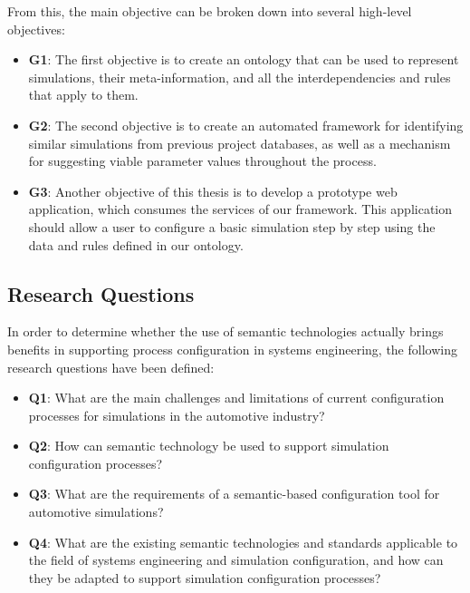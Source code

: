 From this, the main objective can be broken down into several high-level objectives:

\begin{itemize}
  \item \textbf{G1\label{G1}}: The first objective is to create an ontology that can be used to represent simulations, their meta-information, and all the interdependencies and rules that apply to them.

    \item \textbf{G2\label{G2}}: The second objective is to create an automated framework for identifying similar simulations from previous project databases, as well as a mechanism for suggesting viable parameter values throughout the process.
    
    \item \textbf{G3\label{G3}}: Another objective of this thesis is to develop a prototype web application, which consumes the services of our framework. This application should allow a user to configure a basic simulation step by step using the data and rules defined in our ontology.

\end{itemize}


\subsection{Research Questions\label{subsec:reseques}}

In order to determine whether the use of semantic technologies actually brings benefits in supporting process configuration in systems engineering, the following research questions have been defined: 

\begin{itemize}
    \item \textbf{Q1\label{Q1}}: What are the main challenges and limitations of current configuration processes for simulations in the automotive industry?
    \item \textbf{Q2\label{Q2}}: How can semantic technology be used to support simulation configuration processes?
    \item \textbf{Q3\label{Q3}}: What are the requirements of a semantic-based configuration tool for automotive simulations?
    \item \textbf{Q4\label{Q4}}: What are the existing semantic technologies and standards applicable to the field of systems engineering and simulation configuration, and how can they be adapted to support simulation configuration processes?
 \end{itemize}


